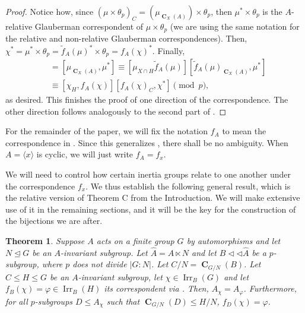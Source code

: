 \documentclass[12pt]{amsart}
\DeclareMathOperator{\CB}{\mathbf{C}}
\DeclareMathOperator{\Irr}{Irr}
\theoremstyle{remark}
\theoremstyle{definition}
\theoremstyle{plain}
\newtheorem{thm}{Theorem}[section]
\theoremstyle{definition}
\numberwithin{equation}{section}
\begin{document}
\begin{proof}
	Notice how, since $(\mu \times \theta_p)_C = (\mu_{\CB_X(A)}) \times \theta_p$, then $\mu^* \times \theta_p$ is the $A$-relative Glauberman correspondent of $\mu \times \theta_p$ (we are using the same notation for the relative and non-relative Glauberman correspondences). Then, $\chi^* = \mu^* \times \theta_p = \tilde{f}_A(\mu)^* \times \theta_p = f_A(\chi)^*$. Finally, 
	\begin{align*}
		[\chi_C, \chi^*] &= [\mu_{\CB_X(A)}, \mu^*] \equiv [\mu_{X \cap H} \tilde{f}_A(\mu)][\tilde{f}_A(\mu)_{\CB_X(A)}, \mu^*] \\
		&\equiv [\chi_H, f_A(\chi)][f_A(\chi)_C, \chi^*] \pmod{p},
	\end{align*}
	as desired. This finishes the proof of one direction of the correspondence. The other direction follows analogously to the second part of .
\end{proof}

For the remainder of the paper, we will fix the notation $f_A$ to mean the correspondence in . Since this generalizes , there shall be no ambiguity. When $A = \langle x \rangle$ is cyclic, we will just write $f_A = f_x$.

We will need to control how certain inertia groups relate to one another under the correspondence $f_x$. We thus establish the following general result, which is the relative version of Theorem C from the Introduction. We will make extensive use of it in the remaining sections, and it will be the key for the construction of the bijections we are after.

\begin{thm}
	\label{relThmC}
	Suppose $A$ acts on a finite group $G$ by automorphisms and let $N \unlhd G$ be an $A$-invariant subgroup. Let $\hat{A} = A \ltimes N$ and let $B {\triangleleft}{\triangleleft} \hat{A}$ be a $p$-subgroup, where $p$ does not divide $|G:N|$. Let $C/N = \CB_{G/N}(B)$. Let $C \leq H \leq G$ be an $A$-invariant subgroup, let $\chi \in \Irr_B(G)$ and let $f_B(\chi) = \varphi \in \Irr_B(H)$ its correspondent via . Then, $A_\chi = A_\varphi$. Furthermore, for all $p$-subgroups $D \leq A_\chi$ such that $\CB_{G/N}(D) \leq H/N$, $f_D(\chi) = \varphi$.
\end{thm}
\end{document}

